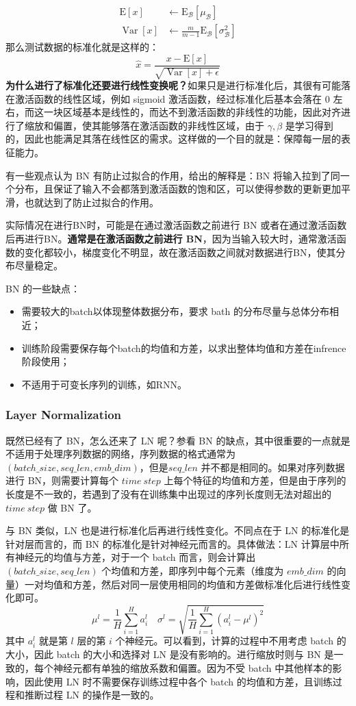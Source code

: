 $$
\begin{aligned}
	\mathrm{E}[x] & \leftarrow \mathrm{E}_{\mathcal{B}}\left[\mu_{\mathcal{B}}\right] \\
	\operatorname{Var}[x] & \leftarrow \frac{m}{m-1} \mathrm{E}_{\mathcal{B}}\left[\sigma_{\mathcal{B}}^{2}\right]
\end{aligned}
$$
那么测试数据的标准化就是这样的：
$$
\widehat{x}=\frac{x-\mathrm{E}[x]}{\sqrt{\operatorname{Var}[x]+\epsilon}}
$$
\textbf{为什么进行了标准化还要进行线性变换呢？}如果只是进行标准化后，其很有可能落在激活函数的线性区域，例如 sigmoid 激活函数，经过标准化后基本会落在 0 左右，而这一块区域基本是线性的，而达不到激活函数的非线性的功能，因此对齐进行了缩放和偏置，使其能够落在激活函数的非线性区域，由于 $\gamma, \beta$ 是学习得到的，因此也能满足其落在线性区的需求。这样做的一个目的就是：保障每一层的表征能力。

有一些观点认为 BN 有防止过拟合的作用，给出的解释是：BN 将输入拉到了同一个分布，且保证了输入不会都落到激活函数的饱和区，可以使得参数的更新更加平滑，也就达到了防止过拟合的作用。


实际情况在进行BN时，可能是在通过激活函数之前进行 BN 或者在通过激活函数后再进行BN。\textbf{通常是在激活函数之前进行 BN}，因为当输入较大时，通常激活函数的变化都较小，梯度变化不明显，故在激活函数之间就对数据进行BN，使其分布尽量稳定。

BN 的一些缺点：
\begin{itemize}
	\item 需要较大的batch以体现整体数据分布，要求 bath 的分布尽量与总体分布相近；
	\item 训练阶段需要保存每个batch的均值和方差，以求出整体均值和方差在infrence阶段使用；
	\item 不适用于可变长序列的训练，如RNN。
\end{itemize}

\subsubsection{Layer Normalization}
既然已经有了 BN，怎么还来了 LN 呢？参看 BN 的缺点，其中很重要的一点就是不适用于处理序列数据的网络，序列数据的格式通常为 $(batch\_size, seq\_len, emb\_dim)$，但是$seq\_len$ 并不都是相同的。如果对序列数据进行 BN，则需要计算每个 $time\ step$ 上每个特征的均值和方差，但是由于序列的长度是不一致的，若遇到了没有在训练集中出现过的序列长度则无法对超出的 $time\ step$ 做 BN 了。

与 BN 类似，LN 也是进行标准化后再进行线性变化。不同点在于 LN 的标准化是针对层而言的，而 BN 的标准化是针对神经元而言的。具体做法：LN 计算层中所有神经元的均值与方差，对于一个 batch 而言，则会计算出 $(batch\_size, seq\_len)$ 个均值和方差，即序列中每个元素（维度为 $emb\_dim$ 的向量）一对均值和方差，然后对同一层使用相同的均值和方差做标准化后进行线性变化即可。
$$
\mu^{l}=\frac{1}{H} \sum_{i=1}^{H} a_{i}^{l} \quad \sigma^{l}=\sqrt{\frac{1}{H} \sum_{i=1}^{H}\left(a_{i}^{l}-\mu^{l}\right)^{2}}
$$
其中 $a_i^l$ 就是第 $l$ 层的第 $i$ 个神经元。可以看到，计算的过程中不用考虑 batch 的大小，因此 batch 的大小和选择对 LN 是没有影响的。进行缩放时则与 BN 是一致的，每个神经元都有单独的缩放系数和偏置。因为不受 batch 中其他样本的影响，因此使用 LN 时不需要保存训练过程中各个 batch 的均值和方差，且训练过程和推断过程 LN 的操作是一致的。

